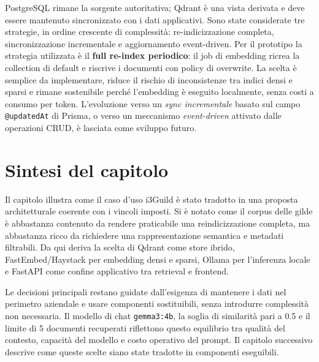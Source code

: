PostgreSQL rimane la sorgente autoritativa; Qdrant è una vista derivata e deve
essere mantenuto sincronizzato con i dati applicativi. Sono state considerate
tre strategie, in ordine crescente di complessità: re-indicizzazione completa,
sincronizzazione incrementale e aggiornamento event-driven. Per il prototipo la
strategia utilizzata è il \textbf{full re-index periodico}: il job di
embedding ricrea la collection di default e riscrive i documenti con policy di
overwrite. La scelta è semplice da implementare,
riduce il rischio di inconsistenze tra indici densi e sparsi e rimane
sostenibile perché l'embedding è eseguito localmente, senza costi a consumo per
token. L'evoluzione verso un \emph{sync incrementale} basato sul campo
\texttt{@updatedAt} di Prisma, o verso un meccanismo \emph{event-driven}
attivato dalle operazioni CRUD, è lasciata come sviluppo futuro.

\section{Sintesi del capitolo}
\label{sec:requirements_design_summary}

Il capitolo illustra come il caso d'uso i3Guild è stato tradotto in una proposta architetturale
coerente con i vincoli imposti. Si è notato come il corpus delle gilde è abbastanza contenuto
da rendere praticabile una reindicizzazione completa, ma abbastanza ricco da
richiedere una rappresentazione semantica e metadati filtrabili. Da qui deriva
la scelta di Qdrant come store ibrido, FastEmbed/Haystack per embedding densi e
sparsi, Ollama per l'inferenza locale e FastAPI come confine applicativo tra
retrieval e frontend.

Le decisioni principali restano guidate dall'esigenza di mantenere i
dati nel perimetro aziendale e usare componenti sostituibili, senza introdurre
complessità non necessaria. Il modello di chat \texttt{gemma3:4b}, la soglia di
similarità pari a 0.5 e il limite di 5 documenti recuperati riflettono questo
equilibrio tra qualità del contesto, capacità del modello e costo operativo
del prompt. Il capitolo successivo descrive come queste scelte siano state
tradotte in componenti eseguibili.
